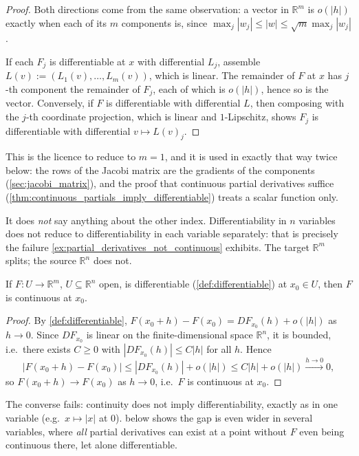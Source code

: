 \begin{proof}
Both directions come from the same observation: a vector in $\mathbb{R}^m$ is $o(|h|)$ exactly
when each of its $m$ components is, since
$\max_j|w_j| \leq |w| \leq \sqrt{m}\max_j|w_j|$.

If each $F_j$ is differentiable at $x$ with differential $L_j$, assemble
$L(v) := (L_1(v),\dots,L_m(v))$, which is linear. The remainder of $F$ at $x$ has $j$-th component
the remainder of $F_j$, each of which is $o(|h|)$, hence so is the vector. Conversely, if $F$ is
differentiable with differential $L$, then composing with the $j$-th coordinate projection, which
is linear and $1$-Lipschitz, shows $F_j$ is differentiable with differential $v \mapsto L(v)_j$.
\end{proof}

\begin{remark}
\label{rem:componentwise_scope}
This is the licence to reduce to $m = 1$, and it is used in exactly that way twice below: the
rows of the Jacobi matrix are the gradients of the components (\cref{sec:jacobi_matrix}), and the
proof that continuous partial derivatives suffice
(\cref{thm:continuous_partials_imply_differentiable}) treats a scalar function only.

It does \emph{not} say anything about the other index. Differentiability in $n$ variables does
not reduce to differentiability in each variable separately: that is precisely the failure
\cref{ex:partial_derivatives_not_continuous} exhibits. The target $\mathbb{R}^m$ splits; the
source $\mathbb{R}^n$ does not.
\end{remark}

\begin{proposition}
\label{prop:differentiable_implies_continuous}
If $F : U \to \mathbb{R}^m$, $U \subseteq \mathbb{R}^n$ open, is differentiable
(\cref{def:differentiable}) at $x_0 \in U$, then $F$ is continuous at $x_0$.
\end{proposition}

\begin{proof}
By \cref{def:differentiable}, $F(x_0+h) - F(x_0) = DF_{x_0}(h) + o(|h|)$ as $h \to 0$. Since
$DF_{x_0}$ is linear on the finite-di\-men\-sional space $\mathbb{R}^n$, it is bounded, i.e.\ there
exists $C \geq 0$ with $|DF_{x_0}(h)| \leq C|h|$ for all $h$. Hence
\[|F(x_0+h) - F(x_0)| \leq |DF_{x_0}(h)| + o(|h|) \leq C|h| + o(|h|) \xrightarrow{h\to 0} 0,\]
so $F(x_0+h) \to F(x_0)$ as $h \to 0$, i.e.\ $F$ is continuous at $x_0$.
\end{proof}

\begin{remark}
The converse fails: continuity does not imply differentiability, exactly as in one variable
(e.g.\ $x \mapsto |x|$ at $0$).  below shows the
gap is even wider in several variables, where \emph{all} partial derivatives can exist at a point
without $F$ even being continuous there, let alone differentiable.
\end{remark}
